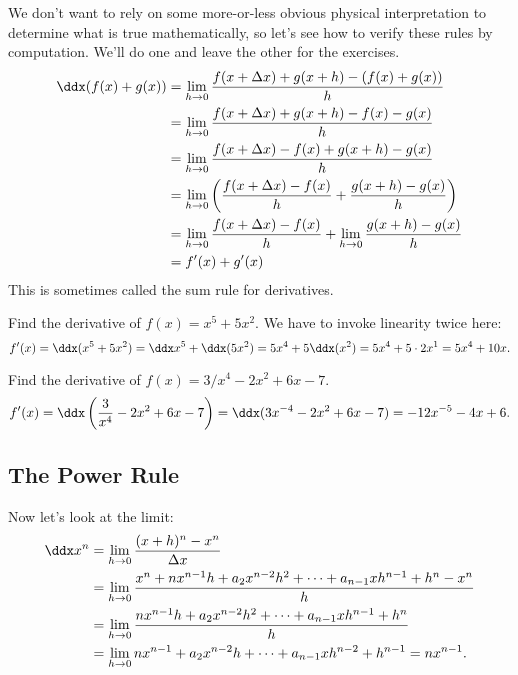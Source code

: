 We don't want to rely on some more-or-less obvious physical
interpretation to determine what is true mathematically, so let's see
how to verify these rules by computation. We'll do one and leave the
other for the exercises.
\begin{align*}
\ddx(f(x)+g(x)) &= \lim_{ h\to 0} {f(x+\Delta
  x)+g(x+ h) - (f(x)+g(x))\over  h}  \\
&= \lim_{ h\to 0} {f(x+\Delta
  x)+g(x+ h) - f(x)-g(x)\over  h}  \\
&= \lim_{ h\to 0} {f(x+\Delta
  x)-f(x) +g(x+ h) -g(x)\over  h}  \\
&= \lim_{ h\to 0} \left({f(x+\Delta
  x)-f(x)\over  h}  +{g(x+ h) -g(x)\over  h}\right)  \\
&= \lim_{ h\to 0} {f(x+\Delta
  x)-f(x)\over  h}  +
\lim_{ h\to 0} {g(x+ h) -g(x)\over  h}  \\
&=f'(x)+g'(x) \\
\end{align*}
This is sometimes called the {\dfont sum rule} for derivatives.
\begin{example}
Find the derivative of $f(x)=x^5+5x^2$. We have to invoke linearity
twice here: 
\[
f'(x) = \ddx(x^5+5x^2) = \ddx x^5 + \ddx(5x^2) =
5x^4+5\ddx(x^2) = 5x^4+5\cdot 2x^1 = 5x^4+10x.
\]
\vskip-10pt\end{example}

\begin{example}
Find the derivative of $f(x)=3/x^4-2x^2+6x-7$.
$$f'(x) = \ddx\left( {3\over x^4}-2x^2+6x-7\right)
= \ddx(3x^{-4}-2x^2+6x-7) 
= -12x^{-5}-4x+6.$$
\vskip-10pt\end{example}




\subsection{The Power Rule}

 Now
let's look at the limit:
\begin{align*}
\ddx x^n &= \lim_{ h\to0} {(x+ h)^n-x^n\over \Delta
  x} \\
&=\lim_{ h\to0} {x^n + nx^{n-1} h + a_2x^{n-2} h^2+\cdots+
a_{n-1}x h^{n-1} +  h^n-x^n\over  h} \\
&=\lim_{ h\to0} {nx^{n-1} h + a_2x^{n-2} h^2+\cdots+
a_{n-1}x h^{n-1} +  h^n\over  h} \\
&=\lim_{ h\to0} nx^{n-1} + a_2x^{n-2} h+\cdots+
a_{n-1}x h^{n-2} +  h^{n-1} = nx^{n-1}. \\
\end{align*}

